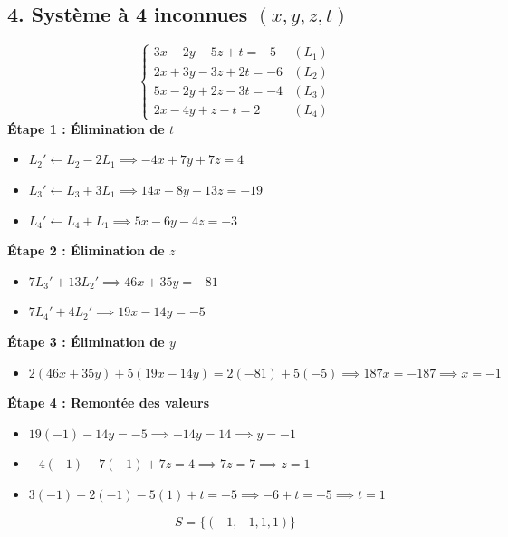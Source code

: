 \documentclass[12pt,a4paper]{article}
\begin{document}
\subsection*{4. Système à 4 inconnues $(x,y,z,t)$}
\[
\begin{cases}
3x - 2y - 5z + t = -5 & (L_1) \\
2x + 3y - 3z + 2t = -6 & (L_2) \\
5x - 2y + 2z - 3t = -4 & (L_3) \\
2x - 4y + z - t = 2 & (L_4)
\end{cases}
\]
\textbf{Étape 1 : Élimination de $t$}
\begin{itemize}[label=$\bullet$]
    \item $L_2' \leftarrow L_2 - 2L_1 \implies -4x + 7y + 7z = 4$
    \item $L_3' \leftarrow L_3 + 3L_1 \implies 14x - 8y - 13z = -19$
    \item $L_4' \leftarrow L_4 + L_1 \implies 5x - 6y - 4z = -3$
\end{itemize}

\textbf{Étape 2 : Élimination de $z$}
\begin{itemize}[label=$\bullet$]
    \item $7L_3' + 13L_2' \implies 46x + 35y = -81$
    \item $7L_4' + 4L_2' \implies 19x - 14y = -5$
\end{itemize}

\textbf{Étape 3 : Élimination de $y$}
\begin{itemize}[label=$\bullet$]
    \item $2(46x + 35y) + 5(19x - 14y) = 2(-81) + 5(-5) \implies 187x = -187 \implies x = -1$
\end{itemize}

\textbf{Étape 4 : Remontée des valeurs}
\begin{itemize}[label=$\bullet$]
    \item $19(-1) - 14y = -5 \implies -14y = 14 \implies y = -1$
    \item $-4(-1) + 7(-1) + 7z = 4 \implies 7z = 7 \implies z = 1$
    \item $3(-1) - 2(-1) - 5(1) + t = -5 \implies -6 + t = -5 \implies t = 1$
\end{itemize}
\[
S = \{(-1, -1, 1, 1)\}
\]

\vspace{0.3cm}

\end{document}
